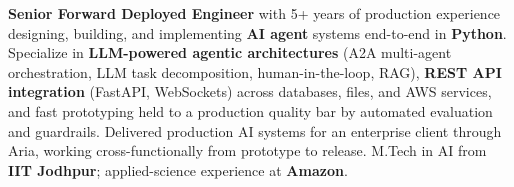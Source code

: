 \documentclass[letter,10pt]{article}
\begin{document}

\textbf{Senior Forward Deployed Engineer} with 5+ years of production experience designing, building, and implementing \textbf{AI agent} systems end-to-end in \textbf{Python}.
Specialize in \textbf{LLM-powered agentic architectures} (A2A multi-agent orchestration, LLM task decomposition, human-in-the-loop, RAG), \textbf{REST API integration} (FastAPI, WebSockets) across databases, files, and AWS services, and fast prototyping held to a production quality bar by automated evaluation and guardrails.
Delivered production AI systems for an enterprise client through Aria, working cross-functionally from prototype to release.
M.Tech in AI from \textbf{IIT Jodhpur}; applied-science experience at \textbf{Amazon}.
\end{document}
